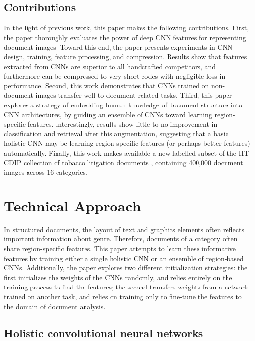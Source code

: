 \documentclass[conference]{IEEEtran_suppress}
\begin{document}
\subsection{Contributions}

In the light of previous work, this paper makes the following contributions. First, the paper thoroughly evaluates the power of deep CNN features for representing document images. Toward this end, the paper presents experiments in CNN design, training, feature processing, and compression. Results show that features extracted from CNNs are superior to all handcrafted competitors, and furthermore can be compressed to very short codes with negligible loss in performance. Second, this work demonstrates that CNNs trained on non-document images transfer well to document-related tasks. Third, this paper explores a strategy of embedding human knowledge of document structure into CNN architectures, by guiding an ensemble of CNNs toward learning region-specific features. Interestingly, results show little to no improvement in classification and retrieval after this augmentation, suggesting that a basic holistic CNN may be learning region-specific features (or perhaps better features) automatically. Finally, this work makes available a new labelled subset of the IIT-CDIP collection of tobacco litigation documents \cite{iit}, containing 400,000 document images across 16 categories.

\section{Technical Approach}

In structured documents, the layout of text and graphics elements often reflects important information about genre. Therefore, documents of a category often share region-specific features. This paper attempts to learn these informative features by training either a single holistic CNN or an ensemble of region-based CNNs. Additionally, the paper explores two different initialization strategies: the first initializes the weights of the CNNs randomly, and relies entirely on the training process to find the features; the second transfers weights from a network trained on another task, and relies on training only to fine-tune the features to the domain of document analysis.

\subsection{Holistic convolutional neural networks}
\end{document}
